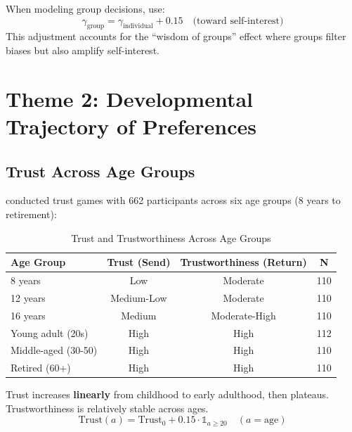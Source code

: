 \begin{tcolorbox}[colback=yellow!5!white, colframe=yellow!75!black,
    title=Implication for LLMMC]
When modeling group decisions, use:
\begin{equation}
\gamma_{\text{group}} = \gamma_{\text{individual}} + 0.15 \quad \text{(toward self-interest)}
\end{equation}
This adjustment accounts for the ``wisdom of groups'' effect where groups filter biases but also amplify self-interest.
\end{tcolorbox}


\section{Theme 2: Developmental Trajectory of Preferences}
\label{sec:su-developmental}

\subsection{Trust Across Age Groups}

\citet{sutter2007trust} conducted trust games with 662 participants across six age groups (8 years to retirement):

\begin{table}[htbp]
\centering
\caption{Trust and Trustworthiness Across Age Groups}
\label{tab:su-trust-age}
\renewcommand{\arraystretch}{1.3}
\begin{tabular}{@{}lccc@{}}
\toprule
\textbf{Age Group} & \textbf{Trust (Send)} & \textbf{Trustworthiness (Return)} & \textbf{N} \\
\midrule
8 years & Low & Moderate & 110 \\
12 years & Medium-Low & Moderate & 110 \\
16 years & Medium & Moderate-High & 110 \\
Young adult (20s) & High & High & 112 \\
Middle-aged (30-50) & High & High & 110 \\
Retired (60+) & High & High & 110 \\
\bottomrule
\end{tabular}
\end{table}

\begin{tcolorbox}[colback=green!5!white, colframe=green!75!black,
    title=Key Result UNMAPPED_SU-2: Age-Trust Gradient]
Trust increases \textbf{linearly} from childhood to early adulthood, then plateaus. Trustworthiness is relatively stable across ages.
\begin{equation}
\text{Trust}(a) = \text{Trust}_0 + 0.15 \cdot \mathbb{1}_{a \geq 20} \quad (a = \text{age})
\end{equation}
\end{tcolorbox}

